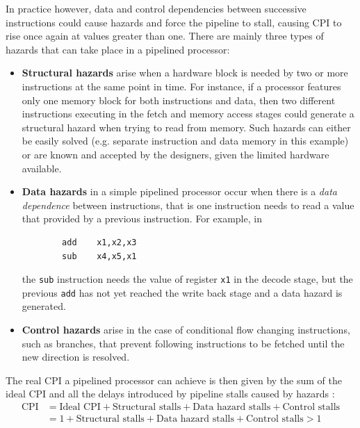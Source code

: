 In practice however, data and control dependencies between successive instructions could cause hazards and force the pipeline to stall, causing CPI to rise once again at values greater than one. There are mainly three types of hazards that can take place in a pipelined processor:
\begin{itemize}
  \item \textbf{Structural hazards} arise when a hardware block is needed by two or more instructions at the same point in time. For instance, if a processor features only one memory block for both instructions and data, then two different instructions executing in the fetch and memory access stages could generate a structural hazard when trying to read from memory. Such hazards can either be easily solved (e.g. separate instruction and data memory in this example) or are known and accepted by the designers, given the limited hardware available.
  \item \textbf{Data hazards} in a simple pipelined processor occur when there is a \emph{data dependence} between instructions, that is one instruction needs to read a value that provided by a previous instruction. For example, in
      \begin{verbatim}
        add    x1,x2,x3
        sub    x4,x5,x1
      \end{verbatim}
      the \texttt{sub} instruction needs the value of register \texttt{x1} in the decode stage, but the previous \texttt{add} has not yet reached the write back stage and a data hazard is generated.
  \item \textbf{Control hazards} arise in the case of conditional flow changing instructions, such as branches, that prevent following instructions to be fetched until the new direction is resolved.
\end{itemize}

The real \ac{CPI} a pipelined processor can achieve is then given by the sum of the ideal \ac{CPI} and all the delays introduced by pipeline stalls caused by hazards \cite[p.~168]{hennessy17}:
\begin{equation}\label{eq:pipe_cpi}
  \begin{split}
    \text{CPI}  & = \text{Ideal CPI} + \text{Structural stalls} + \text{Data hazard stalls} + \text{Control stalls} \\
                & = 1 + \text{Structural stalls} + \text{Data hazard stalls} + \text{Control stalls} > 1
  \end{split}
\end{equation}

